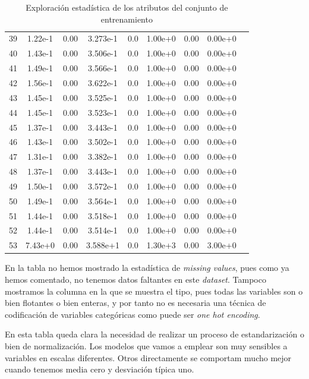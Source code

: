 \documentclass[11pt]{article}
\begin{document}
\begin{table}[H]
{\begin{tabular}{|c|c|c|c|c|c|c|c|c|}
    39   & 1.22e-1&       0.00&  3.273e-1&     0.0&  1.00e+0&      0.00&  0.00e+0 \\
    40   & 1.43e-1&       0.00&  3.506e-1&     0.0&  1.00e+0&      0.00&  0.00e+0 \\
    41   & 1.49e-1&       0.00&  3.566e-1&     0.0&  1.00e+0&      0.00&  0.00e+0 \\
    42   & 1.56e-1&       0.00&  3.622e-1&     0.0&  1.00e+0&      0.00&  0.00e+0 \\
    43   & 1.45e-1&       0.00&  3.525e-1&     0.0&  1.00e+0&      0.00&  0.00e+0 \\
    44   & 1.45e-1&       0.00&  3.523e-1&     0.0&  1.00e+0&      0.00&  0.00e+0 \\
    45   & 1.37e-1&       0.00&  3.443e-1&     0.0&  1.00e+0&      0.00&  0.00e+0 \\
    46   & 1.43e-1&       0.00&  3.502e-1&     0.0&  1.00e+0&      0.00&  0.00e+0 \\
    47   & 1.31e-1&       0.00&  3.382e-1&     0.0&  1.00e+0&      0.00&  0.00e+0 \\
    48   & 1.37e-1&       0.00&  3.443e-1&     0.0&  1.00e+0&      0.00&  0.00e+0 \\
    49   & 1.50e-1&       0.00&  3.572e-1&     0.0&  1.00e+0&      0.00&  0.00e+0 \\
    50   & 1.49e-1&       0.00&  3.564e-1&     0.0&  1.00e+0&      0.00&  0.00e+0 \\
    51   & 1.44e-1&       0.00&  3.518e-1&     0.0&  1.00e+0&      0.00&  0.00e+0 \\
    52   & 1.44e-1&       0.00&  3.514e-1&     0.0&  1.00e+0&      0.00&  0.00e+0 \\
    53   & 7.43e+0&       0.00&  3.588e+1&     0.0&  1.30e+3&      0.00&  3.00e+0 \\
    \hline
  \end{tabular}
}
\caption{Exploración estadística de los atributos del conjunto de entrenamiento}
\end{table}

En la tabla no hemos mostrado la estadística de \emph{missing values}, pues como ya hemos comentado, no tenemos datos faltantes en este \emph{dataset}. Tampoco mostramos la columna en la que se muestra el tipo, pues todas las variables son o bien flotantes o bien enteras, y por tanto no es necesaria una técnica de codificación de variables categóricas como puede ser \emph{one hot encoding}.

En esta tabla queda clara la necesidad de realizar un proceso de estandarización o bien de normalización. Los modelos que vamos a emplear son muy sensibles a variables en escalas diferentes. Otros directamente se comportam mucho mejor cuando tenemos media cero y desviación típica uno.
\end{document}
